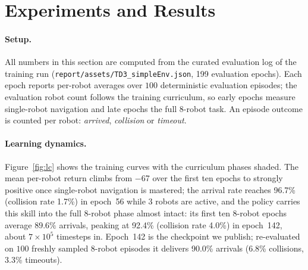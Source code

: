 \documentclass[11pt,a4paper]{article}
\newcommand{\NumEpochs}{199}
\newcommand{\CurriculumCap}{8}
\newcommand{\EarlyReturn}{$-$67}
\newcommand{\BestArrived}{92.4\%}
\newcommand{\BestCollision}{4.0\%}
\newcommand{\BestEpoch}{142}
\newcommand{\PeakArrived}{96.7\%}
\newcommand{\PeakCollision}{1.7\%}
\newcommand{\PeakEpoch}{56}
\newcommand{\PeakRobots}{3}
\newcommand{\FreshArrived}{90.0\%}
\newcommand{\FreshCollision}{6.8\%}
\newcommand{\FreshTimeout}{3.3\%}
\begin{document}
\section{Experiments and Results}
\label{sec:results}
\paragraph{Setup.}
All numbers in this section are computed from the curated evaluation log of
the training run (\texttt{report/assets/TD3\_simpleEnv.json}, \NumEpochs{}
evaluation epochs). Each epoch reports per-robot averages over $100$
deterministic evaluation episodes; the evaluation robot count follows the
training curriculum, so early epochs measure single-robot navigation and
late epochs the full \CurriculumCap-robot task. An episode outcome is
counted per robot: \emph{arrived}, \emph{collision} or \emph{timeout}.

\paragraph{Learning dynamics.}
Figure~\ref{fig:lc} shows the training curves with the curriculum phases
shaded. The mean per-robot return climbs from \EarlyReturn{} over the first
ten epochs to strongly positive once single-robot navigation is mastered;
the arrival rate reaches \PeakArrived{} (collision rate \PeakCollision) in
epoch~\PeakEpoch{} while \PeakRobots{} robots are active, and the policy
carries this skill into the full \CurriculumCap-robot phase almost intact:
its first ten \CurriculumCap-robot epochs average $89.6\%$ arrivals, peaking
at \BestArrived{} (collision rate \BestCollision) in epoch~\BestEpoch{},
about $7 \times 10^5$ timesteps in. Epoch~\BestEpoch{} is the checkpoint we
publish; re-evaluated on $100$ freshly sampled \CurriculumCap-robot
episodes it delivers \FreshArrived{} arrivals (\FreshCollision{} collisions,
\FreshTimeout{} timeouts).
\end{document}
